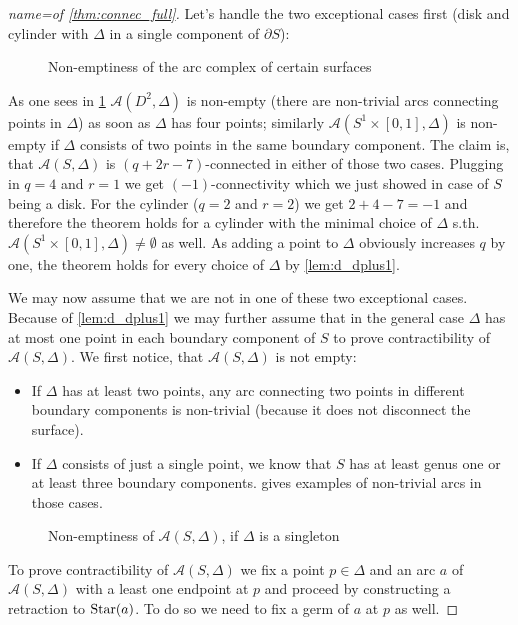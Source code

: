 \begin{proof}[{name={of \autoref{thm:connec_full}}}]
	Let's handle the two exceptional cases first (disk and cylinder with $\Delta$ in a single component of $\partial S$):
	\begin{figure}[htb]
		\centering
		\caption{Non-emptiness of the arc complex of certain surfaces}\label{fig:non-empty}
	\end{figure}
	As one sees in \cref{fig:non-empty} $\mathcal{A}(D^2,\Delta)$ is non-empty (there are non-trivial arcs connecting points in $\Delta$) as soon as $\Delta$ has four points; similarly $\mathcal{A}(S^1 \times [0,1],\Delta)$ is non-empty if $\Delta$ consists of two points in the same boundary component.
	The claim is, that $\mathcal{A}(S,\Delta)$ is $(q+2r -7)$-connected in either of those two cases.
	Plugging in $q=4$ and $r=1$ we get $(-1)$-connectivity which we just showed in case of $S$ being a disk.
	For the cylinder ($q=2$ and $r=2$) we get $2 +4 -7 =-1$ and therefore the theorem holds for a cylinder with the minimal choice of $\Delta$ s.th. $\mathcal{A}(S^1\times [0,1],\Delta) \neq \emptyset$ as well.
	As adding a point to $\Delta$ obviously increases $q$ by one, the theorem holds for every choice of $\Delta$ by \autoref{lem:d_dplus1}.
	
	We may now assume that we are not in one of these two exceptional cases.
	Because of \autoref{lem:d_dplus1} we may further assume that in the general case $\Delta$ has at most one point in each boundary component of $S$ to prove contractibility of $\mathcal{A}(S,\Delta)$. 
	We first notice, that $\mathcal{A}(S,\Delta)$ is not empty: 
	\begin{itemize}
		\item If $\Delta$ has at least two points, any arc connecting two points in different boundary components is non-trivial (because it does not disconnect the surface).
		\item If $\Delta$ consists of just a single point, we know that $S$ has at least genus one or at least three boundary components.
		 gives examples of non-trivial arcs in those cases.
	\end{itemize}
	\begin{figure}[htb]
		\centering
		\caption{Non-emptiness of $\mathcal{A}(S,\Delta)$, if $\Delta$ is a singleton}\label{fig:non-empty-delta-one}
	\end{figure}
	To prove contractibility of $\mathcal{A}(S,\Delta)$ we fix a point $p \in \Delta$ and an arc $a$ of $\mathcal{A}(S,\Delta)$ with a least one endpoint at $p$ and proceed by
	constructing a retraction to $\operatorname{Star}(a)$.
	To do so we need to fix a germ of $a$ at $p$ as well.
	

\end{proof}
